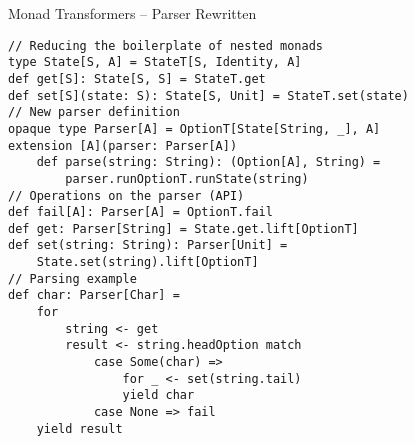 \documentclass[presentation, 10pt]{beamer}\mode<presentation>{\usetheme{AMSBolognaFC}}
\begin{document}
\begin{frame}[fragile, shrink=15]{Monad Transformers -- Parser Rewritten}
\begin{tcolorbox}
\begin{verbatim}
// Reducing the boilerplate of nested monads
type State[S, A] = StateT[S, Identity, A]
def get[S]: State[S, S] = StateT.get
def set[S](state: S): State[S, Unit] = StateT.set(state)
// New parser definition
opaque type Parser[A] = OptionT[State[String, _], A]
extension [A](parser: Parser[A])
	def parse(string: String): (Option[A], String) =
		parser.runOptionT.runState(string)
// Operations on the parser (API)
def fail[A]: Parser[A] = OptionT.fail
def get: Parser[String] = State.get.lift[OptionT]
def set(string: String): Parser[Unit] =
	State.set(string).lift[OptionT]
// Parsing example
def char: Parser[Char] =
	for
		string <- get
		result <- string.headOption match
			case Some(char) =>
				for _ <- set(string.tail)
				yield char
			case None => fail
	yield result
\end{verbatim}
\end{tcolorbox}
\end{frame}
\end{document}

